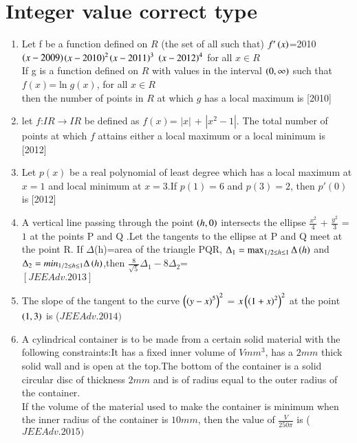 \documentclass[journal,12pt,twocolumn]{IEEEtran}
\theoremstyle{remark}
\begin{document}
																					  \section{Integer value correct type}
																					  \begin{enumerate}
																					  \item Let f be a function defined on $R$ (the set of all such that) $f'\left(x\right)$=2010$\left(x-2009\right)$$\left(x-2010\right)^2$$\left(x-2011\right)^3$ $\left(x-2012\right)^4$ for all $x \in R$ \\ If g is a function defined on $R$ with values in the interval $\left(0,\infty\right)$ such that \\
																					    $f(x)$=$\ln{g(x)}$, for all $x\in R$\\ then the number of points in $R$ at which $g$ has a local maximum is \hfill [2010]\\
																					    \item let $f$:$IR \rightarrow IR$ be defined as $f(x)$= $|x|$ + $|x^2-1|$. The total number of points at which $f$ attains either a local maximum or a local minimum is\\ \hfill [2012] \\
																					    \item Let $p(x)$ be a real polynomial of least degree which has a local maximum at $x=1$ and local minimum at $x=3$.If $p(1)=6$ and $p(3)=2$, then $p'(0)$ is \hfill [2012] \\
																					    \item A vertical line passing through the point $\left(h,0\right)$ intersects the ellipse $\frac{x^2}{4}$ + $\frac{y^2}{3}$ = $1$ at the points P and Q .Let the tangents to the ellipse at P and Q meet at the point R. If $\Delta$(h)=area of the triangle PQR, $\Delta_1  = \max _{1/2\leq h \leq 1}\Delta\left(h\right)$ and $\Delta_2 = min_{1/2\leq h \leq 1}\Delta\left(h\right)$,then $\frac{8}{\sqrt{5}}\Delta_1 - 8\Delta_2$=\\\hfill $[JEEAdv.2013]$\\
																					    \item The slope of the tangent to the curve $\left(\left(y-x\right)^5\right)^2$ = $x\left(\left(1+x\right)^2\right)^2$ at the point $\left(1,3\right)$ is \hfill ($JEE Adv. 2014)$ \\
																					    \item A cylindrical container is to be made from a certain solid material with the following constraints:It has a fixed inner volume of $V mm^3$, has a $2mm$ thick solid wall and is open at the top.The bottom of the container is a solid circular disc of thickness $2mm$ and is of radius equal to the outer radius of the container.\\If the volume of the material used to make the container is minimum when the inner radius of the container is $10mm$, then the value of $\frac{V}{250\pi}$ is \hfill ($JEE Adv. 2015)$ \\  
																					    \end{enumerate}
																					    
\end{document}
